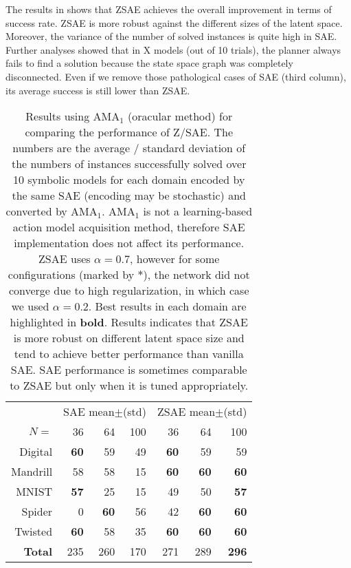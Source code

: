 The results in  shows that ZSAE achieves the overall improvement in terms of success rate.
ZSAE is more robust against the different sizes of the latent space.
Moreover, the variance of the number of solved instances is quite high in SAE.
% 
Further analyses showed that
in X models (out of 10 trials), the planner always fails to find a solution because
the state space graph was completely disconnected.
% 
Even if we remove those pathological cases of SAE (third column), its average success is still
lower than ZSAE.

\begin{table}[htbp]
\centering
\begin{tabular}{r|rrr|rrr}
 & \multicolumn{3}{c|}{SAE mean$\pm$(std)} & \multicolumn{3}{c}{ZSAE mean$\pm$(std)} \\ 
$N=$           & {36}        & {64}        & {100} & {36}        & {64}        & {100}        \\\hline
Digital        & \textbf{60} & 59          & 49    & \textbf{60} & 59          & 59           \\
Mandrill       & 58          & 58          & 15    & \textbf{60} & \textbf{60} & \textbf{60}  \\
MNIST          & \textbf{57} & 25          & 15    & 49          & 50          & \textbf{57}  \\
Spider         & 0           & \textbf{60} & 56    & 42          & \textbf{60} & \textbf{60}  \\
Twisted        & \textbf{60} & 58          & 35    & \textbf{60} & \textbf{60} & \textbf{60}  \\\hline
\textbf{Total} & {235}       & {260}       & {170} & {271}       & {289}       & \textbf{296} \\
\end{tabular}
\caption{Results using AMA$_1$ (oracular method) for comparing the performance of Z/SAE.
The numbers are the average / standard deviation of the numbers of instances successfully solved
 over 10 symbolic models for each domain encoded by the same SAE (encoding may be stochastic) and converted by AMA$_1$.
AMA$_1$ is not a learning-based action model acquisition method, therefore SAE implementation does not affect its performance.
ZSAE uses $\alpha=0.7$, however for some configurations (marked by $*$), the network did not converge due to high regularization, in which case we used $\alpha=0.2$.
Best results in each domain are highlighted in \textbf{bold}.
Results indicates that ZSAE is more robust on different latent space size and tend to achieve better performance than vanilla SAE.
SAE performance is sometimes comparable to ZSAE but only when it is tuned appropriately.
}
\label{tab:ama1}
\end{table}

